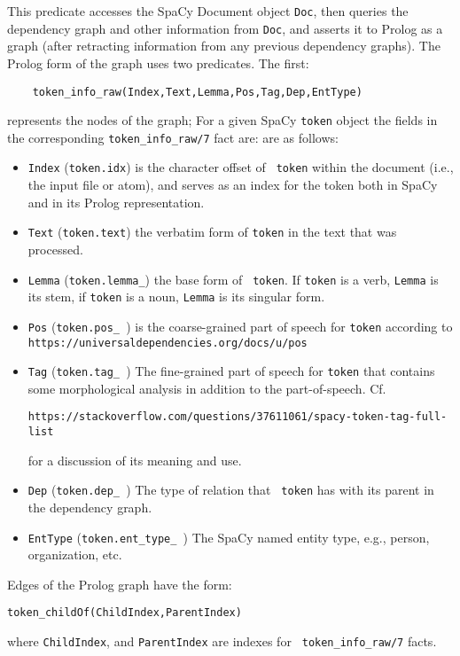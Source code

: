 \begin{description}
%    
This predicate accesses the SpaCy Document object {\tt Doc}, then
queries the dependency graph and other information from {\tt Doc}, and
asserts it to Prolog as a graph (after retracting information from any
previous dependency graphs).  The Prolog form of the graph uses two
predicates.  The first:
\begin{verbatim}  
    token_info_raw(Index,Text,Lemma,Pos,Tag,Dep,EntType)
\end{verbatim}
represents the nodes of the graph; For a given SpaCy {\tt token}
object the fields in the corresponding {\tt token\_info\_raw/7} fact are:
are as follows:
\begin{itemize}
  \item {\tt Index} ({\tt token.idx}) is the character offset of {\tt
    token} within the document (i.e., the input file or atom), and
    serves as an index for the token both in SpaCy and in its Prolog
    representation.
  \item {\tt Text} ({\tt token.text}) the verbatim form of {\tt token}
    in the text that was processed.
  \item {\tt Lemma} ({\tt token.lemma\_}) the base form of {\tt
    token}.  If {\tt token} is a verb, {\tt Lemma} is its stem, if
    {\tt token} is a noun, {\tt Lemma} is its singular form.
  \item {\tt Pos} ({\tt token.pos\_ }) is the coarse-grained part of
    speech for {\tt token} according to {\tt
      https://universaldependencies.org/docs/u/pos}
  \item {\tt Tag} ({\tt token.tag\_ }) The fine-grained part of speech
    for {\tt token} that contains some morphological analysis in
    addition to the part-of-speech.
    Cf.

    {\tt https://stackoverflow.com/questions/37611061/spacy-token-tag-full-list}

      for a discussion of its meaning and use.
  \item {\tt Dep} ({\tt token.dep\_ }) The type of relation that {\tt
    token} has with its parent in the dependency graph.
  \item {\tt EntType} ({\tt token.ent\_type\_ }) The SpaCy named entity
    type, e.g., person, organization, etc.
\end{itemize}  

Edges of the Prolog graph have the form:
\begin{verbatim}
token_childOf(ChildIndex,ParentIndex)
\end{verbatim}
where {\tt ChildIndex}, and {\tt ParentIndex} are indexes for {\tt
  token\_info\_raw/7} facts.


\end{description}
